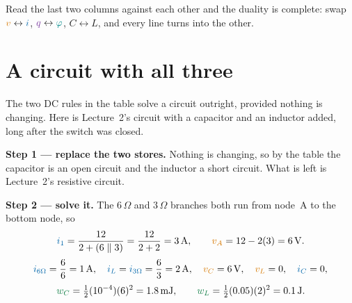 \documentclass[11pt,a4paper]{article}
\newcommand{\Icol}[1]{\textcolor{ccur}{#1}}
\newcommand{\Vcol}[1]{\textcolor{cvolt}{#1}}
\newcommand{\Pcol}[1]{\textcolor{cpow}{#1}}
\newcommand{\Qcol}[1]{\textcolor{ccharge}{#1}}
\newcommand{\Fcol}[1]{\textcolor{cflux}{#1}}
\newcommand{\uni}[1]{\,\mathrm{#1}}
\newcommand{\A}{\uni{A}}   \newcommand{\V}{\uni{V}}
\newcommand{\ohm}{\,\Omega}
\begin{document}
Read the last two columns against each other and the duality is complete: swap
$\Vcol{v}\leftrightarrow\Icol{i}$, $\Qcol{q}\leftrightarrow\Fcol{\varphi}$,
$C\leftrightarrow L$, and every line turns into the other.

\section{A circuit with all three}

The two DC rules in the table solve a circuit outright, provided nothing is changing.
Here is Lecture~2's circuit with a capacitor and an inductor added, long after the switch
was closed.

\begin{center}
\end{center}

\begin{examplebox}


\textbf{Step 1 --- replace the two stores.} Nothing is changing, so by the table the
capacitor is an open circuit and the inductor a short circuit. What is left is Lecture~2's
resistive circuit.

\textbf{Step 2 --- solve it.} The $6\ohm$ and $3\ohm$ branches both run from node~A to the
bottom node, so
\[
  \Icol{i_1} = \frac{12}{2 + (6\parallel 3)} = \frac{12}{2+2} = 3\A ,
  \qquad
  \Vcol{v_A} = 12 - 2(3) = 6\V .
\]
\vspace{-12pt}
\[
  \Icol{i_{6\Omega}} = \frac{6}{6} = 1\A, \quad
  \Icol{i_{L}} = \Icol{i_{3\Omega}} = \frac{6}{3} = 2\A, \quad
  \Vcol{v_C} = 6\V, \quad \Vcol{v_L} = 0 , \quad \Icol{i_C} = 0 ,
\]
\vspace{-12pt}
\[
  \Pcol{w_C} = \tfrac12 (10^{-4})(6)^2 = 1.8\uni{mJ}, \qquad
  \Pcol{w_L} = \tfrac12 (0.05)(2)^2 = 0.1\J .
\]
\end{examplebox}
\end{document}

